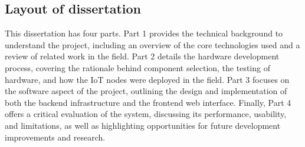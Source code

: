 \subsection{Layout of dissertation}

This dissertation has four parts. Part 1 provides the technical background to
understand the project, including an overview of the core technologies used and
a review of related work in the field. Part 2 details the hardware development
process, covering the rationale behind component selection, the testing of
hardware, and how the IoT nodes were deployed in the field. Part 3 focuses on
the software aspect of the project, outlining the design and implementation of
both the backend infrastructure and the frontend web interface. Finally, Part 4
offers a critical evaluation of the system, discussing its performance,
usability, and limitations, as well as highlighting opportunities for future
development improvements and research.

